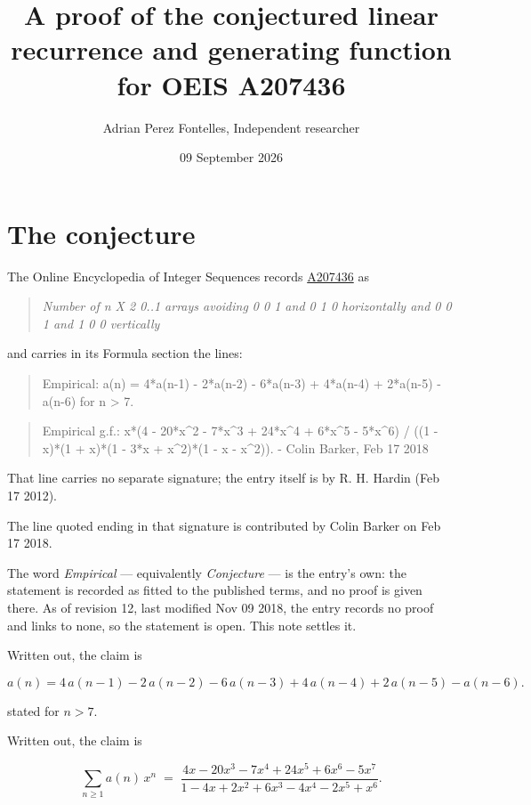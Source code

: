 \documentclass[11pt]{article}
\title{A proof of the conjectured linear recurrence and generating function for OEIS A207436}
\author{Adrian Perez Fontelles, Independent researcher}
\date{09 September 2026}
\theoremstyle{definition}
\begin{document}
\maketitle
\section{The conjecture}

The Online Encyclopedia of Integer Sequences records \href{https://oeis.org/A207436}{A207436} as

\begin{quote}\itshape Number of n X 2 0..1 arrays avoiding 0 0 1 and 0 1 0 horizontally and 0 0 1 and 1 0 0 vertically\end{quote}

and carries in its Formula section the lines:

\begin{quote}\ttfamily Empirical: a(n) = 4*a(n-1) - 2*a(n-2) - 6*a(n-3) + 4*a(n-4) + 2*a(n-5) - a(n-6) for n > 7.\end{quote}

\begin{quote}\ttfamily Empirical g.f.: x*(4 - 20*x\textasciicircum{}2 - 7*x\textasciicircum{}3 + 24*x\textasciicircum{}4 + 6*x\textasciicircum{}5 - 5*x\textasciicircum{}6) / ((1 - x)*(1 + x)*(1 - 3*x + x\textasciicircum{}2)*(1 - x - x\textasciicircum{}2)). - Colin Barker, Feb 17 2018\end{quote}

That line carries no separate signature; the entry itself is by R. H. Hardin (Feb 17 2012).

The line quoted ending in that signature is contributed by Colin Barker on Feb 17 2018.

The word {\itshape Empirical} --- equivalently {\itshape Conjecture} --- is the entry's own: the statement is recorded as fitted to the published terms, and no proof is given there. As of revision 12, last modified Nov 09 2018, the entry records no proof and links to none, so the statement is open. This note settles it.

Written out, the claim is

\[a(n) = 4\,a(n-1) - 2\,a(n-2) - 6\,a(n-3) + 4\,a(n-4) + 2\,a(n-5) - a(n-6).\]

stated for $n > 7$.

Written out, the claim is

\[\sum_{n \ge 1} a(n)\,x^n \;=\; \frac{4x - 20x^{3} - 7x^{4} + 24x^{5} + 6x^{6} - 5x^{7}}{1 - 4x + 2x^{2} + 6x^{3} - 4x^{4} - 2x^{5} + x^{6}}.\]
\end{document}
